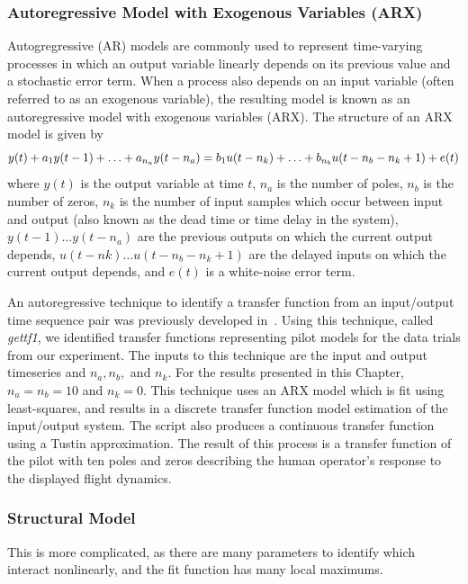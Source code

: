 \subsubsection{Autoregressive Model with Exogenous Variables (ARX)}
Autogregressive (AR) models are commonly used to represent time-varying processes in which an output variable linearly depends on its previous value and a stochastic error term.
When a process also depends on an input variable (often referred to as an exogenous variable), the resulting model is known as an autoregressive model with exogenous variables (ARX).
The structure of an ARX model is given by
\begin{equation}
    y(t) + a_1 y(t-1) + \ldots + a_{n_a} y(t - n_a) = \\
    b_1 u(t-n_k) + \ldots + b_{n_b} u(t-n_b - n_k+1) + e(t)
\end{equation}
where $y(t)$ is the output variable at time $t$, $n_a$ is the number of poles, $n_b$ is the number of zeros, $n_k$ is the number of input samples which occur between input and output (also known as the dead time or time delay in the system), $y(t-1) \ldots y(t-n_a)$ are the previous outputs on which the current output depends, $u(t-nk) \ldots u(t-n_b - n_k+1)$ are the delayed inputs on which the current output depends, and $e(t)$ is a white-noise error term.

An autoregressive technique to identify a transfer function from an input/output time sequence pair was previously developed in~\citet{hess_modeling_2002}.
Using this technique, called \textit{gettf1}, we identified transfer functions representing pilot models for the data trials from our experiment.
The inputs to this technique are the input and output timeseries and $n_a, n_b,$ and $n_k$.
For the results presented in this Chapter, $n_a = n_b = 10$ and $n_k = 0$.
This technique uses an ARX model which is fit using least-squares, and results in a discrete transfer function model estimation of the input/output system.
The script also produces a continuous transfer function using a Tustin approximation.
The result of this process is a transfer function of the pilot with ten poles and zeros describing the human operator's response to the displayed flight dynamics.

\subsubsection{Structural Model}
This is more complicated, as there are many parameters to identify which interact nonlinearly, and the fit function has many local maximums.


